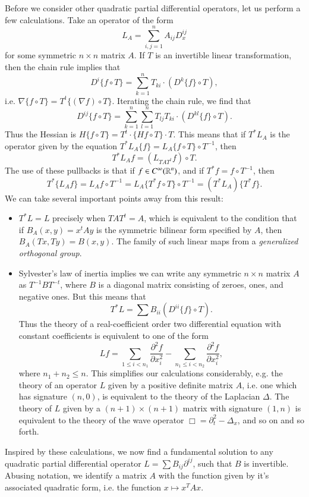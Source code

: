 Before we consider other quadratic partial differential operators, let us perform a few calculations. Take an operator of the form
%
\[ L_A = \sum_{i,j = 1}^n A_{ij} D^{ij}_x \]
%
for some symmetric $n \times n$ matrix $A$. If $T$ is an invertible linear transformation, then the chain rule implies that
%
\[ D^i \{ f \circ T \} = \sum_{k = 1}^n T_{ki} \cdot (D^k \{ f \} \circ T), \]
%
i.e. $\nabla \{ f \circ T \} = T^t \{ (\nabla f) \circ T \}$. Iterating the chain rule, we find that
%
\[ D^{ij} \{ f \circ T \} = \sum_{k = 1}^n \sum_{l = 1}^n T_{lj} T_{ki} \cdot (D^{kl} \{ f \} \circ T). \]
%
Thus the Hessian is $H \{ f \circ T \} = T^t \cdot \{ Hf \circ T \} \cdot T$. This means that if $T^* L_A$ is the operator given by the equation $T^*L_A \{ f \} = L_A \{ f \circ T \} \circ T^{-1}$, then
%
\[ T^*L_A f = (L_{TAT^t} f) \circ T. \]
%
The use of these pullbacks is that if $f \in C^\infty(\operatorname{\mathbb{R}}^n)$, and if $T^* f = f \circ T^{-1}$, then
%
\[ T^* \{ L_A f \} = L_A f \circ T^{-1} = L_A \{ T^* f \circ T \} \circ T^{-1} = (T^* L_A) \{ T^* f \}. \]
%
We can take several important points away from this result:
%
\begin{itemize}
    \item $T^*L = L$ precisely when $TAT^t = A$, which is equivalent to the condition that if $B_A(x,y) = x^t A y$ is the symmetric bilinear form specified by $A$, then $B_A(Tx,Ty) = B(x,y)$. The family of such linear maps from a \emph{generalized orthogonal group}.

    \item Sylvester's law of inertia implies we can write any symmetric $n \times n$ matrix $A$ as $T^{-1} B T^{-t}$, where $B$ is a diagonal matrix consisting of zeroes, ones, and negative ones. But this means that
    \[ T^* L = \sum B_{ii} (D^{ii} \{ f \} \circ T). \]
    Thus the theory of a real-coefficient order two differential equation with constant coefficients is equivalent to one of the form
    \[ Lf = \sum_{1 \leq i < n_1} \frac{\partial^2 f}{\partial x_i^2} - \sum_{n_1 \leq i < n_2} \frac{\partial^2 f}{\partial x_i^2}, \]
    where $n_1 + n_2 \leq n$. This simplifies our calculations considerably, e.g. the theory of an operator $L$ given by a positive definite matrix $A$, i.e. one which has signature $(n,0)$, is equivalent to the theory of the Laplacian $\Delta$. The theory of $L$ given by a $(n+1) \times (n+1)$ matrix with signature $(1,n)$ is equivalent to the theory of the wave operator $\Box = \partial_t^2 - \Delta_x$, and so on and so forth.
\end{itemize}
%
Inspired by these calculations, we now find a fundamental solution to any quadratic partial differential operator $L = \sum B_{ij} \partial^{ij}$, such that $B$ is invertible. Abusing notation, we identify a matrix $A$ with the function given by it's associated quadratic form, i.e. the function $x \mapsto x^T A x$.

